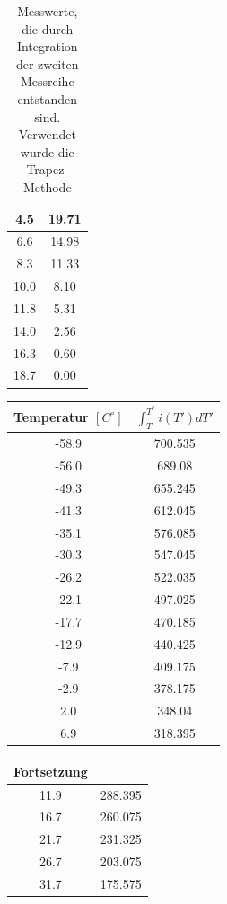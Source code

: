 \begin{table}[htbp]
\begin{minipage}[t]{0.45\textwidth}
\begin{tabular}{c|c}
4.5 &19.71\\\hline
6.6 &14.98\\\hline
8.3 &11.33\\\hline
10.0 &8.10\\\hline
11.8 &5.31\\\hline
14.0 &2.56\\\hline
16.3 &0.60\\\hline
18.7 &0.00\\\hline
\end{tabular}
\end{minipage}
\caption{Messwerte, die durch Integration der zweiten Messreihe entstanden sind. Verwendet wurde die Trapez-Methode }
\label{tab_int1}
\end{table}

\begin{table}[htbp]
\begin{minipage}[t]{0.45\textwidth}
\centering
\begin{tabular}{c|c}
Temperatur $[C^\circ]$ & $\int ^{T^*}_{T} i(T')dT'$\\\hline
-58.9 &700.535\\\hline
-56.0 &689.08\\\hline
-49.3 &655.245\\\hline
-41.3 &612.045\\\hline
-35.1 &576.085\\\hline
-30.3 &547.045\\\hline
-26.2 &522.035\\\hline
-22.1 &497.025\\\hline
-17.7 &470.185\\\hline
-12.9 &440.425\\\hline
-7.9 &409.175\\\hline
-2.9 &378.175\\\hline
2.0 &348.04\\\hline
6.9 &318.395\\
\end{tabular}
\end{minipage}
\begin{minipage}[t]{0.45\textwidth}
\centering
\begin{tabular}{c|c}
Fortsetzung & \\\hline
11.9 &288.395\\\hline
16.7 &260.075\\\hline
21.7 &231.325\\\hline
26.7 &203.075\\\hline
31.7 &175.575\\\hline

\end{tabular}
\end{minipage}
\end{table}
